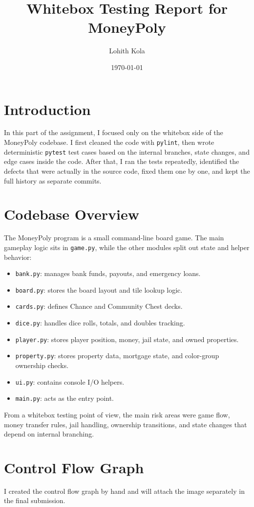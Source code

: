 \documentclass[12pt]{article}
\title{Whitebox Testing Report for MoneyPoly}
\author{Lohith Kola}
\date{\today}
\begin{document}
\maketitle

\section{Introduction}
In this part of the assignment, I focused only on the whitebox side of the MoneyPoly codebase. I first cleaned the code with \texttt{pylint}, then wrote deterministic \texttt{pytest} test cases based on the internal branches, state changes, and edge cases inside the code. After that, I ran the tests repeatedly, identified the defects that were actually in the source code, fixed them one by one, and kept the full history as separate commits.

\section{Codebase Overview}
The MoneyPoly program is a small command-line board game. The main gameplay logic sits in \texttt{game.py}, while the other modules split out state and helper behavior:

\begin{itemize}
  \item \texttt{bank.py}: manages bank funds, payouts, and emergency loans.
  \item \texttt{board.py}: stores the board layout and tile lookup logic.
  \item \texttt{cards.py}: defines Chance and Community Chest decks.
  \item \texttt{dice.py}: handles dice rolls, totals, and doubles tracking.
  \item \texttt{player.py}: stores player position, money, jail state, and owned properties.
  \item \texttt{property.py}: stores property data, mortgage state, and color-group ownership checks.
  \item \texttt{ui.py}: contains console I/O helpers.
  \item \texttt{main.py}: acts as the entry point.
\end{itemize}

From a whitebox testing point of view, the main risk areas were game flow, money transfer rules, jail handling, ownership transitions, and state changes that depend on internal branching.

\section{Control Flow Graph}
I created the control flow graph by hand and will attach the image separately in the final submission.
\end{document}
